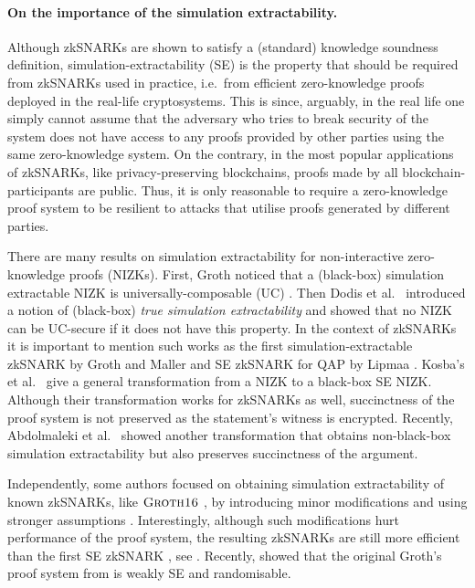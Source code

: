 \let\accentvec\vec \documentclass[runningheads]{llncs}
\begin{document}
\paragraph{On the importance of the simulation extractability.}
Although zkSNARKs are shown to satisfy a (standard) knowledge soundness definition,
simulation-extractability (SE) is the property that should be required from
zkSNARKs used in practice, i.e.~from efficient zero-knowledge proofs deployed in
the real-life cryptosystems. This is since, arguably, in the real life one simply cannot
assume that the adversary who tries to break security of the system does not
have access to any proofs provided by other parties using the same
zero-knowledge system. On the contrary, in the most popular applications of
zkSNARKs, like privacy-preserving blockchains, proofs made by all
blockchain-participants are public. Thus, it is only reasonable to require 
a zero-knowledge proof system to be resilient to attacks that utilise proofs
generated by different parties.

There are many results on simulation extractability for
non-interactive zero-knowledge proofs (NIZKs). First, Groth \cite{AC:Groth07}
noticed that a (black-box) simulation extractable NIZK is
universally-composable (UC) 
\cite{EPRINT:Canetti00}. Then Dodis et al.~\cite{AC:DHLW10} introduced a
notion of (black-box) \emph{true simulation extractability} and showed that no
NIZK can be UC-secure if it does not have this property. 
In the context of zkSNARKs it is important to mention such works as the first
simulation-extractable zkSNARK by Groth and Maller \cite{C:GroMal17} and SE
zkSNARK for QAP by Lipmaa \cite{EPRINT:Lipmaa19a}. 
Kosba's et
al.~\cite{EPRINT:KZMQCP15} give a general transformation from a NIZK to a
black-box SE NIZK. Although their transformation works for zkSNARKs as well,
succinctness of the proof system is not preserved as the statement's witness is encrypted.
Recently, Abdolmaleki et al.~\cite{CCS:AbdRamSla20} showed another transformation that
obtains non-black-box simulation extractability but also preserves
succinctness of the argument.

Independently, some authors focused on obtaining simulation extractability of
known zkSNARKs, like $\textsc{Groth16}$ \cite{EC:Groth16}, by introducing minor modifications and using
stronger assumptions \cite{EPRINT:BowGab18,EPRINT:AtaBag19}. Interestingly,
although such modifications hurt performance of the proof system, the resulting
zkSNARKs are still more efficient than the first SE zkSNARK \cite{C:GroMal17},
see \cite{EPRINT:AtaBag19}. Recently, \cite{EPRINT:BKSV20} showed that the
original Groth's proof system from \cite{EC:Groth16} is weakly SE and
randomisable.  
\end{document}
